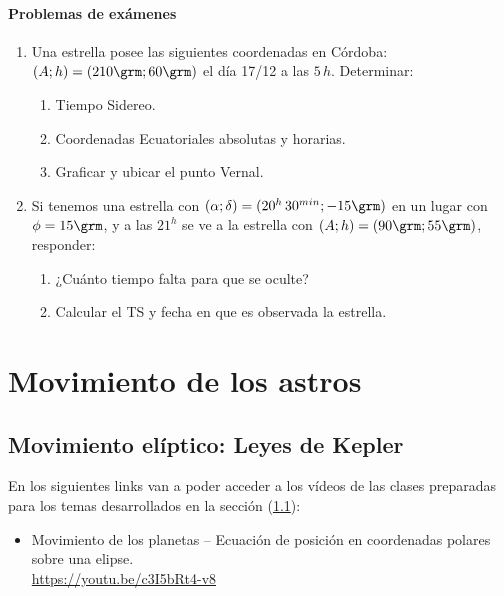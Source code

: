\subsubsection*{Problemas de exámenes}
\begin{enumerate}
  \item Una estrella posee las siguientes coordenadas en Córdoba:
    \((A;h)=(210\grm;60\grm)\) el día 17/12 a las \(5\,h\). Determinar:
    \begin{enumerate}
      \item Tiempo Sidereo.
      \item Coordenadas Ecuatoriales absolutas y horarias.
      \item Graficar y ubicar el punto Vernal.
    \end{enumerate}

  \item Si tenemos una estrella con \( (\alpha; \delta) = (20^h\,30^{min};
    -15\grm) \) en un lugar con \( \phi = 15\grm \), y a las \( 21^h \) se ve a
    la estrella con \( (A;h)= (90\grm; 55\grm) \), responder:
    \begin{enumerate}
      \item ¿Cuánto tiempo falta para que se oculte?
      \item Calcular el TS y fecha en que es observada la estrella.
    \end{enumerate}

\end{enumerate}
\normalsize


\chapter{Movimiento de los astros}

\section{Movimiento elíptico: Leyes de Kepler}
\label{c.kepler}

En los siguientes links van a poder acceder a los vídeos de las clases
preparadas para los temas desarrollados en la sección (\ref{c.kepler}):

\begin{itemize}
  \item Movimiento de los planetas -- Ecuación de posición en coordenadas
    polares sobre una elipse.\\
    \href{https://youtu.be/c3I5bRt4-v8}{https://youtu.be/c3I5bRt4-v8}
\end{itemize}


